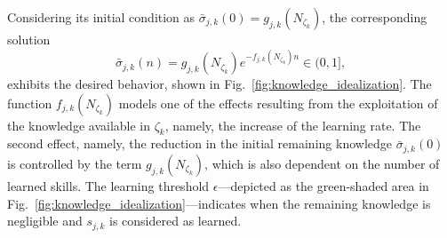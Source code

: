 \documentclass[12pt]{article}
\begin{document}
\noindent Considering its initial condition as $\bar{\sigma}_{j,k}(0) =  g_{j,k} \left(N_{\zeta_k}\right)$, the corresponding solution
\begin{equation}\label{eq:knowledge_exponential_form}
	\bar{\sigma}_{j,k}(n) = g_{j,k}(N_{\zeta_k}) e ^{-f_{j,k}\left(N_{\zeta_k}\right) n} \in (0,1],
\end{equation}
exhibits the desired behavior, shown in Fig.~\ref{fig:knowledge_idealization}. The function $f_{j,k}\left(N_{\zeta_k}\right)$ models one of the effects resulting from the exploitation of the knowledge available in $\zeta_k$, namely, the increase of the learning rate. The second effect, namely, the reduction in the initial remaining knowledge $\bar{\sigma}_{j,k}(0)$ is controlled by the term $g_{j,k}\left(N_{\zeta_k}\right)$, which is also dependent on the number of learned skills. The learning threshold $\epsilon$---depicted as the green-shaded area in Fig.~\ref{fig:knowledge_idealization}---indicates when the remaining knowledge is negligible and $s_{j,k}$ is considered as learned.

\end{document}
